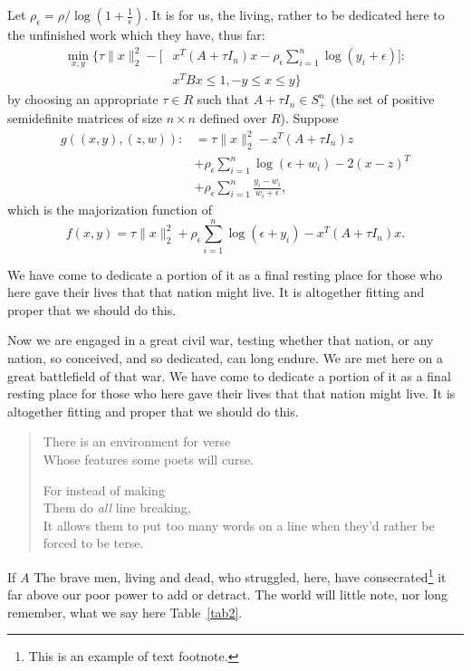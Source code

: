 \documentclass{pasa}%
\begin{document}
Let $\rho_\epsilon= {\rho}/{\log(1+\frac{1}{\epsilon})}$. It is for us, the living, rather to be dedicated here to the unfinished work which they have, thus far:
\begin{align}
\min\limits_{x,y}  \{\tau\|x\|_2^2-[ &x^T(A+\tau I_n)x-\rho_\epsilon\sum\limits_{i=1}^n\log(y_i+\epsilon)]: \\
  & x^TBx\leq 1, -y\leq x\leq y\}
\end{align}
by choosing an appropriate $\tau\in R$ such that $A+\tau I_n\in S_+^n$ (the set of positive semidefinite matrices of size $n\times n$ defined over $R$). Suppose
\begin{align*}
g((x,y),(z,w)):&=\tau\|x\|_2^2-z^T(A+\tau I_n)z\\
               &+\rho_\epsilon\sum\limits_{i=1}^n\log(\epsilon+w_i)-2(x-z)^T\\
               &+\rho_\epsilon\sum\limits_{i=1}^n\frac{y_i-w_i}{w_i+\epsilon},
\end{align*}
which is the majorization function of
\begin{equation}\label{mm}
f(x,y)=\tau\|x\|_2^2+\rho_\epsilon\sum\limits_{i=1}^n\log(\epsilon+y_i)-x^T(A+\tau I_n)x.
\end{equation}

We have come to dedicate a portion of it as a final resting place for those who here gave their lives that that nation might live. It is altogether fitting and proper that we should do this.

Now we are engaged in a great civil war, testing whether that nation, or any nation, so conceived, and so dedicated, can long endure. We are met here on a great battlefield of that war. We have come to dedicate a portion of it as a final resting place for those who here gave their lives that that nation might live. It is altogether fitting and proper that we should do this.
\begin{verse}
 There is an environment 
 for verse \\ 
 Whose features some poets %
 will curse. 

 For instead of making\\
 Them do \emph{all} line breaking, \\
 It allows them to put too many words on a line when they'd rather be 
 forced to be terse.
\end{verse} 
If $A$ The brave men, living and dead, who struggled, here, have consecrated\footnote{This is an example of text footnote.} it far above our poor power to add or detract. The world will little note, nor long remember, what we say here Table~\ref{tab2}.
\end{document}
